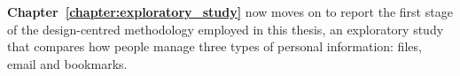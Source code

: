 


\textbf{Chapter~\ref{chapter:exploratory_study}} now moves on to report the first stage of the design-centred methodology employed in this thesis, an exploratory study that compares how people manage three types of personal information: files, email and bookmarks.

